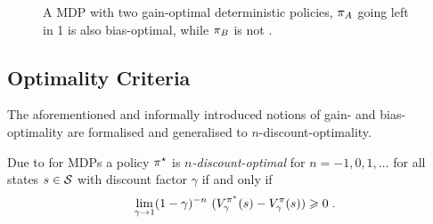 \documentclass[envcountsame]{llncs}
\begin{document}
\begin{figure}[t!]
  \centering
  \caption{\label{fig:three-states} A MDP with two gain-optimal deterministic policies, \(\pi_{A}\)
    going left in 1 is also bias-optimal, while \(\pi_{B}\) is not \citep[Adapted
    from][]{Mahadevan96_AverageRewardReinforcementLearningFoundationsAlgorithmsAndEmpiricalResults}.}
\end{figure}


\subsection{Optimality Criteria}
\label{subsec:More_Refined_Optimality_Criteria}

The aforementioned and informally introduced notions of gain- and bias-optimality are formalised and
generalised to \(n\)-discount-optimality.

\begin{definition}
  Due to \citet{Veinott69} for MDPs a policy \(\pi^{\star}\) is \emph{\(n\)-discount-optimal} for
  \(n=-1,0,1,\ldots\) for all states \(s \in \mathcal{S}\) with discount factor
  \(\gamma\) %
  if and only if
  \begin{align*}
    \lim_{\gamma \to 1}(1-\gamma)^{-n}\ (V_{\gamma}^{\polopt}(s) - V_{\gamma}^{\pol}(s)) \geqslant 0 \tpkt
  \end{align*}
\end{definition}
\end{document}
